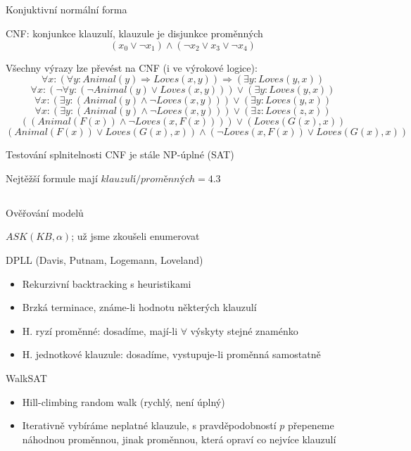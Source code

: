 \documentclass{beamer}
\begin{document}
\subsection{}
\begin{frame}{Konjuktivní normální forma}
\begin{center}
CNF: konjunkce klauzulí, klauzule je disjunkce proměnných
$$(x_0 \lor \lnot x_1) \land (\lnot x_2 \lor x_3 \lor \lnot x_4)$$

Všechny výrazy lze převést na CNF (i ve výrokové logice):
$$ \forall x: (\forall y: Animal(y) \Rightarrow Loves(x, y)) \Rightarrow (\exists y: Loves(y, x))$$
$$ \forall x: (\lnot \forall y: (\lnot Animal(y) \lor Loves(x,y))) \lor (\exists y: Loves(y, x)) $$
$$ \forall x: (\exists y: (Animal(y) \land \lnot Loves(x, y))) \lor (\exists y: Loves(y, x)) $$
$$ \forall x: (\exists y: (Animal(y) \land \lnot Loves(x, y))) \lor (\exists z: Loves(z, x)) $$
$$ ((Animal(F(x)) \land \lnot Loves(x, F(x)))) \lor (Loves(G(x), x)) $$
$$ (Animal(F(x)) \lor Loves(G(x), x)) \land (\lnot Loves(x, F(x)) \lor Loves(G(x),x)) $$

Testování splnitelnosti CNF je stále NP-úplné (SAT)

Nejtěžší formule mají $klauzulí/proměnných=4.3$
\end{center}
\end{frame}

\subsection{}
\begin{frame}{Ověřování modelů}
\begin{center}
$ASK(KB, \alpha)$; už jsme zkoušeli enumerovat
\end{center}

\begin{block}{DPLL (Davis, Putnam, Logemann, Loveland)}
\begin{itemize}
\item Rekurzivní backtracking s heuristikami
\item Brzká terminace, známe-li hodnotu některých klauzulí
\item H. ryzí proměnné: dosadíme, mají-li $\forall$ výskyty stejné znaménko
\item H. jednotkové klauzule: dosadíme, vystupuje-li proměnná samostatně
\end{itemize}
\end{block}

\begin{block}{WalkSAT}
\begin{itemize}
\item Hill-climbing random walk (rychlý, není úplný)
\item Iterativně vybíráme neplatné klauzule, s pravděpodobností $p$ přepeneme náhodnou proměnnou, jinak proměnnou, která opraví co nejvíce klauzulí
\end{itemize}
\end{block}
\end{frame}
\end{document}
